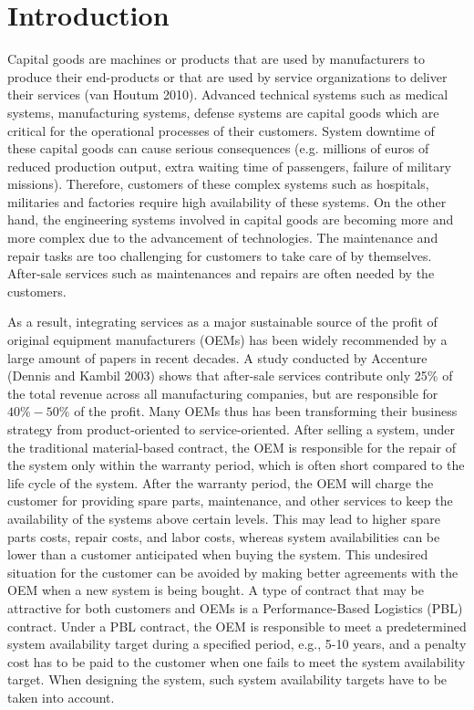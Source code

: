 \documentclass[10pt,a4paper]{article}
\author{Hao Peng}
\begin{document}
\section{Introduction}

Capital goods are machines or products that are used by manufacturers to produce their end-products or
that are used by service organizations to deliver their services (van Houtum 2010). Advanced technical systems such as medical systems, manufacturing systems, defense systems are capital goods which are critical for the operational processes of their customers. System downtime of these capital goods can cause serious consequences (e.g. millions of euros of reduced production output, extra waiting time of passengers, failure of military missions). Therefore, customers of these complex systems such as hospitals, militaries and factories require high availability of these systems. On the other hand, the engineering systems involved in capital goods are becoming more and more complex due to the advancement of technologies. The maintenance and repair tasks are too challenging for customers to take care of by themselves. After-sale services such as maintenances and repairs are often needed by the customers.

As a result, integrating services as a major sustainable source of the profit of original equipment manufacturers (OEMs) has been widely recommended by a large amount of papers in recent decades. A study conducted by Accenture (Dennis and Kambil 2003) shows that after-sale services contribute only 25\% of the total revenue across all manufacturing companies, but are responsible for $40\%-50\%$ of the profit. Many OEMs thus has been transforming their business strategy from product-oriented to service-oriented. After selling a system, under the traditional material-based contract, the OEM is responsible for the repair of the system only within the warranty period, which is often short compared to the life cycle of the system. After the warranty period, the OEM will charge the customer for providing spare parts, maintenance, and other services to keep the availability of the systems above certain levels. This may lead to higher spare parts costs, repair costs, and labor costs, whereas system availabilities can be lower than a customer anticipated when buying the system. This undesired situation for the customer can be avoided by making better agreements with the OEM when a new system is being bought. A type of contract that may be attractive for both customers and OEMs is a Performance-Based Logistics (PBL) contract. Under a PBL contract, the OEM is responsible to meet a predetermined system availability target during a specified period, e.g., 5-10 years, and a penalty cost has to be paid to the customer when one fails to meet the system availability target. When designing the system, such system availability targets have to be taken into account.
\end{document}
